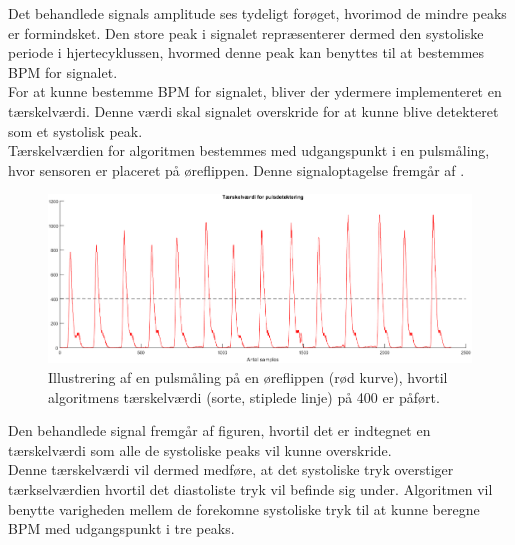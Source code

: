Det behandlede signals amplitude ses tydeligt forøget, hvorimod de mindre peaks er formindsket. Den store peak i signalet repræsenterer dermed den systoliske periode i hjertecyklussen, hvormed denne peak kan benyttes til at bestemmes BPM for signalet. \\
For at kunne bestemme BPM for signalet, bliver der ydermere implementeret en tærskelværdi. Denne værdi skal signalet overskride for at kunne blive detekteret som et systolisk peak. \\
Tærskelværdien for algoritmen bestemmes med udgangspunkt i en pulsmåling, hvor sensoren er placeret på øreflippen. Denne signaloptagelse fremgår af .

\begin{figure}[H]
	\centering
	\includegraphics[scale=0.46]{figures/cDesign/puls_taerskel.png}
	\caption{Illustrering af en pulsmåling på en øreflippen (rød kurve), hvortil algoritmens tærskelværdi (sorte, stiplede linje) på 400 er påført.}
	\label{fig:taerskel_puls}
\end{figure}

Den behandlede signal fremgår af figuren, hvortil det er indtegnet en tærskelværdi som alle de systoliske peaks vil kunne overskride.\\
Denne tærskelværdi vil dermed medføre, at det systoliske tryk overstiger tærkselværdien hvortil det diastoliste tryk vil befinde sig under. Algoritmen vil benytte varigheden mellem de forekomne systoliske tryk til at kunne beregne BPM med udgangspunkt i tre peaks. 


